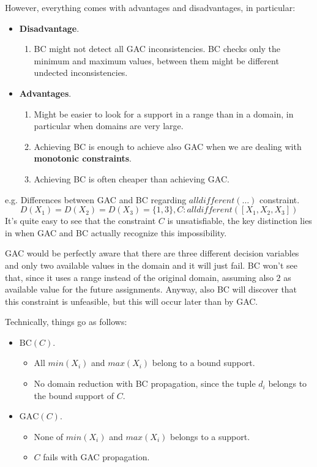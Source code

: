 However, everything comes with advantages and disadvantages, in particular:
\begin{itemize}
    \renewcommand{\labelitemi}{-}
    \item \textbf{Disadvantage}.
    \begin{enumerate}
        \item BC might not detect all GAC inconsistencies. BC checks only the minimum and maximum values, between them might be different undected inconsistencies.
    \end{enumerate}
    \item \textbf{Advantages}.
    \begin{enumerate}
        \item Might be easier to look for a support in a range than in a domain, in particular when domains are very large.
        \item Achieving BC is enough to achieve also GAC when we are dealing with \textbf{monotonic constraints}.
        \item Achieving BC is often cheaper than achieving GAC.
    \end{enumerate}
\end{itemize}
\begin{example}
    e.g. Differences between GAC and BC regarding $\textit{alldifferent}(\dots)$ constraint.
    $$ D(X_1) = D(X_2) = D(X_3) = \{1, 3\}, C:\textit{alldifferent}([X_1, X_2, X_3]) $$
    It's quite easy to see that the constraint $C$ is unsatisfiable, the key distinction lies in when GAC and BC actually recognize this impossibility. \vspace{7pt}
    
    GAC would be perfectly aware that there are three different decision variables and only two available values in the domain and it will just fail.
    BC won't see that, since it uses a range instead of the original domain, assuming also $2$ as available value for the future assignments. Anyway, also BC
    will discover that this constraint is unfeasible, but this will occur later than by GAC. \vspace{7pt}

    Technically, things go as follows:
    \begin{itemize}
        \renewcommand{\labelitemi}{-}
        \item $\text{BC}(C)$.
        \begin{itemize}
            \item All $min(X_i)$ and $max(X_i)$ belong to a bound support.
            \item No domain reduction with BC propagation, since the tuple $d_i$ belongs to the bound support of $C$.
        \end{itemize} 
        \item $\text{GAC}(C)$.
        \begin{itemize}
            \item None of $min(X_i)$ and $max(X_i)$ belongs to a support. 
            \item $C$ fails with GAC propagation.
        \end{itemize} 
    \end{itemize}
\end{example}
